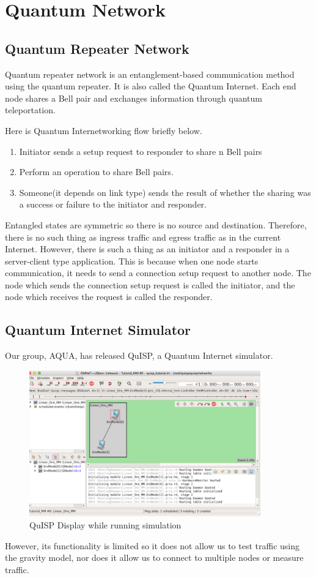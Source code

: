 \section{Quantum Network}
\subsection{Quantum Repeater Network}
Quantum repeater network is an entanglement-based communication method using the quantum repeater.
It is also called the Quantum Internet.
Each end node shares a Bell pair and exchanges information through quantum teleportation.

\begin{screen}
Here is Quantum Internetworking flow briefly below.
    \begin{enumerate}
        \item Initiator sends a setup request to responder to share n Bell pairs
        \item Perform an operation to share Bell pairs.
        \item Someone(it depends on link type) sends the result of whether the sharing was a success or failure to the initiator and responder.
    \end{enumerate}
\end{screen}

Entangled states are symmetric so there is no source and destination.
Therefore, there is no such thing as ingress traffic and egress traffic as in the current Internet.
However, there is such a thing as an initiator and a responder in a server-client type application.
This is because when one node starts communication, it needs to send a connection setup request to another node.
The node which sends the connection setup request is called the initiator, and the node which receives the request is called the responder.

\subsection{Quantum Internet Simulator}
Our group, AQUA, has released QuISP, a Quantum Internet simulator. \cite{satoh2021quisp}

\begin{figure}[H]
    \centering
    \includegraphics[width=10cm]{img/QuISP_screenshot.png}
    \caption{QuISP Display while running simulation}
    \label{fig:QuISP} 
\end{figure}

However, its functionality is limited so it does not allow us to test traffic using the gravity model, nor does it allow us to connect to multiple nodes or measure traffic.

